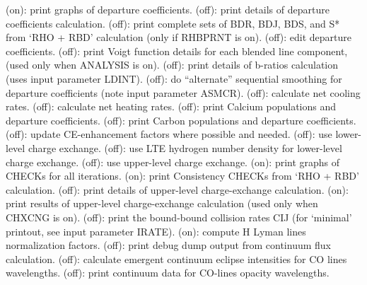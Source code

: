 \space \vbox { (on): \bang
print graphs of departure coefficients.}
\space \vbox { (off): \bang
print details of departure coefficients calculation.}
\space \vbox { (off): \bang
print complete sets of BDR, BDJ, BDS, and S* from `RHO + RBD' calculation 
(only if RHBPRNT is on).}
\space \vbox { (off): \bang 
edit departure coefficients.}
\space \vbox { (off): \bang
print Voigt function details for each blended line component,
(used only when ANALYSIS is on).}
\space \vbox { (off): \bang
print details of b-ratios calculation (uses input parameter LDINT).}
\space \vbox { (off): \bang
do ``alternate'' sequential smoothing for departure coefficients
(note input parameter ASMCR).}
\space \vbox { (off): \bang
calculate net cooling rates.}
\space \vbox { (off): \bang
calculate net heating rates.}
\space \vbox { (off): \bang
print Calcium populations and departure coefficients.}
\space \vbox { (off): \bang 
print Carbon populations and departure coefficients.}
\space \vbox { (off): \bang
update CE-enhancement factors where possible and needed.}
\space \vbox { (off): \bang 
use lower-level charge exchange.}
\space \vbox { (off): \bang
use LTE hydrogen number density for lower-level charge exchange.}
\space \vbox { (off): \bang 
use upper-level charge exchange.}
\space \vbox { (on): \bang 
print graphs of CHECKs for all iterations.}
\space \vbox { (on): \bang 
print Consistency CHECKs from `RHO + RBD' calculation.}
\space \vbox { (off): \bang 
print details of upper-level charge-exchange calculation.}
\space \vbox { (on): \bang 
print results of upper-level charge-exchange calculation
(used only when CHXCNG is on).}
\space \vbox { (off): \bang 
print the bound-bound collision rates CIJ (for `minimal' printout,
see input parameter IRATE).}
\space \vbox { (on): \bang
compute H Lyman lines normalization factors.}
\space \vbox { (off): \bang
print debug dump output from continuum flux calculation.}
\space \vbox { (off): \bang
calculate emergent continuum eclipse intensities for CO lines wavelengths.}
\space \vbox { (off): \bang
print continuum data for CO-lines opacity wavelengths.}
